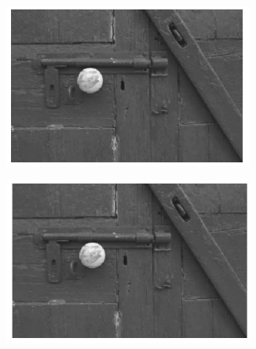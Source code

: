 \documentclass{article}
\begin{document}
\begin{figure}[H]
    \begin{subfigure}{0.5\textwidth}
        \includegraphics[width=0.9\textwidth]{puertita20-1.png} 
    \end{subfigure}\hfill
    \begin{subfigure}{0.5\textwidth}
        \includegraphics[width=0.9\textwidth]{puertita20-200.png} 
    \end{subfigure}
\end{figure}
\end{document}
